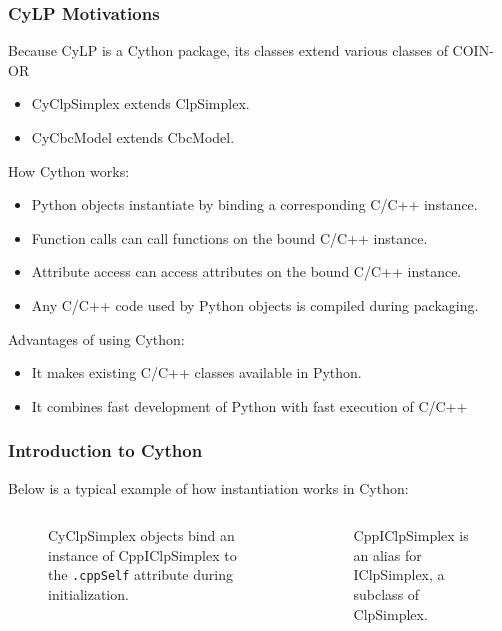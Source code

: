\documentclass{beamer}
\begin{document}
	\begin{frame}[t]
		\frametitle{CyLP Motivations}
		\small
		Because CyLP is a Cython package, its classes extend various classes of COIN-OR
		\begin{itemize}
			\item CyClpSimplex extends ClpSimplex.
			\item CyCbcModel extends CbcModel.
		\end{itemize}
		How Cython works:
		\begin{itemize}
			\item Python objects instantiate by binding a corresponding C/C++ instance.
			\item Function calls can call functions on the bound C/C++ instance.
			\item Attribute access can access attributes on the bound C/C++ instance.
			\item Any C/C++ code used by Python objects is compiled during packaging.
		\end{itemize}
		Advantages of using Cython:
		\begin{itemize}
			\item It makes existing C/C++ classes available in Python.
			\item It combines fast development of Python with fast execution of C/C++
		\end{itemize}
		\normalsize
	\end{frame}

	\begin{frame}[t]
		\frametitle{Introduction to Cython}
		\small
		Below is a typical example of how instantiation works in Cython:
		\begin{columns}[T]
			\begin{column}{0.5\textwidth}
				\begin{figure}[h]
					\caption{CyClpSimplex objects bind an instance of CppIClpSimplex to the \texttt{.cppSelf} attribute during initialization.}
					\label{p:cyclp_init}
				\end{figure}
			\end{column}
			\begin{column}{0.5\textwidth}
				\begin{figure}[h]
					\caption{CppIClpSimplex is an alias for IClpSimplex, a subclass of ClpSimplex.}
					\label{p:iclp_init}
				\end{figure}
			\end{column}
		\end{columns}
		\normalsize
	\end{frame}
\end{document}
